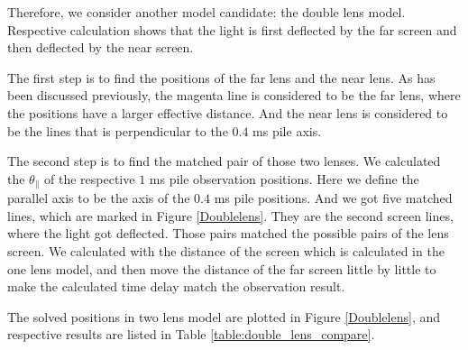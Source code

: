 \documentclass{emulateapj}
\begin{document}
Therefore, we consider another model candidate: the double lens model. Respective calculation shows that the light is first deflected by the far screen and then deflected by the near screen. 

The first step is to find the positions of the far lens and the near lens. As has been discussed previously, the magenta line is considered to be the far lens, where the positions have a larger effective distance. And the near lens is considered to be the lines that is perpendicular to the $0.4$ ms pile axis. 

The second step is to find the matched pair of those two lenses. We calculated the $\theta_{\parallel}$ of the respective $1$ ms pile observation positions. Here we define the parallel axis to be the axis of the $0.4$ ms pile positions. And we got five matched lines, which are marked in Figure \ref{Doublelens}. They are the second screen lines, where the light got deflected. Those pairs matched the possible pairs of the lens screen. We calculated with the distance of the screen which is calculated in the one lens model, and then move the distance of the far screen little by little to make the calculated time delay match the observation result.

The solved positions in two lens model are plotted in Figure \ref{Doublelens}, and respective results are listed in Table \ref{table:double_lens_compare}.  



\end{document}
